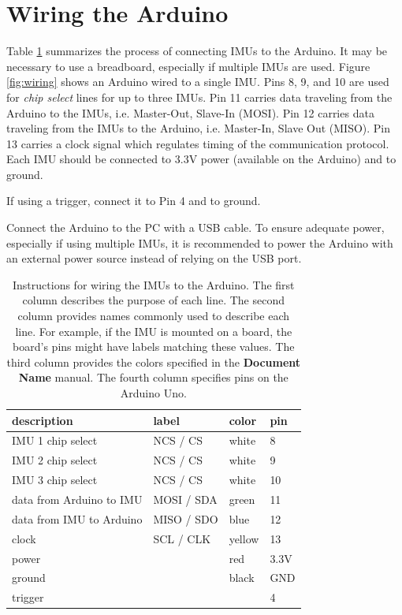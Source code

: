 \documentclass[11pt,letterpaper,article,oneside]{memoir}
\begin{document}
\section{Wiring the Arduino}
\label{sec:wiring}
Table \ref{tab:wiring} summarizes the process of connecting IMUs to the Arduino.
It may be necessary to use a breadboard, especially if multiple IMUs are used.
Figure \ref{fig:wiring} shows an Arduino wired to a single IMU.  Pins 8, 9, and
10 are used for \emph{chip select} lines for up to three IMUs. Pin 11 carries
data traveling from the Arduino to the IMUs, i.e. Master-Out, Slave-In (MOSI).
Pin 12 carries data traveling from the IMUs to the Arduino, i.e. Master-In,
Slave Out (MISO). Pin 13 carries a clock signal which regulates timing of the
communication protocol.  Each IMU should be connected to 3.3V power (available
on the Arduino) and to ground.

If using a trigger, connect it to Pin 4 and to ground.

Connect the Arduino to the PC with a USB cable.  To ensure adequate power,
especially if using multiple IMUs, it is recommended to power the Arduino with
an external power source instead of relying on the USB port.

\begin{table}
\centering
\begin{tabular}{@{}*4l@{}}
\toprule
description & label & color & pin \\
\midrule 
IMU 1 chip select & NCS / CS & white & 8 \\
IMU 2 chip select & NCS / CS & white & 9 \\
IMU 3 chip select & NCS / CS & white & 10 \\
data from Arduino to IMU & MOSI / SDA & green & 11 \\
data from IMU to Arduino & MISO / SDO & blue & 12 \\
clock & SCL / CLK & yellow & 13 \\
power &  & red & 3.3V \\
ground &  & black & GND \\
trigger &  &  & 4 \\
\bottomrule
\end{tabular}
\caption{Instructions for wiring the IMUs to the Arduino. The first column
describes the purpose of each line. The second column provides names commonly
used to describe each line. For example, if the IMU is mounted on a board, the
board's pins might have labels matching these values. The third column provides
the colors specified in the \textbf{Document Name} manual. The fourth column
specifies pins on the Arduino Uno.}
\label{tab:wiring}
\end{table}
\end{document}
